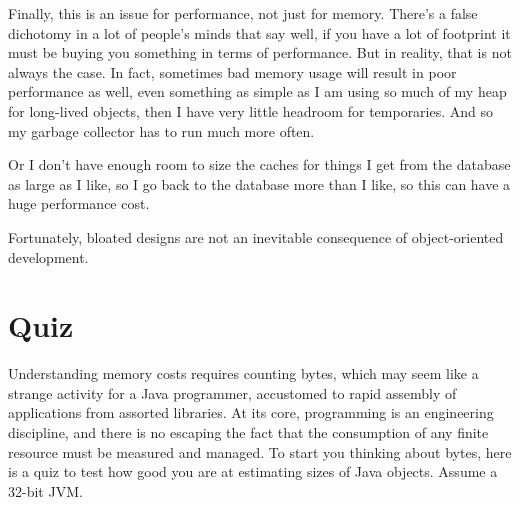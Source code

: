 Finally, this is an issue for performance, not just for memory. 
There's a false dichotomy in a lot of people's minds that say well, if you have a lot of footprint it must be buying
 you something in terms of performance. But in reality, that is not always the case. In fact, sometimes bad memory usage
  will result in poor performance as well, even something as simple as I am using so much of my heap for long-lived objects, 
  then I have very little headroom for temporaries.  And so my garbage collector has to run much more often. 

Or I don't have enough room to size the caches for things I get from the database as large as I like, 
so I go back to the database more than I like, so this can have a huge performance cost.

Fortunately, bloated designs are not an inevitable consequence of object-oriented development.

\section{Quiz}

Understanding memory costs requires counting bytes, which may seem like a strange activity for a Java programmer,
 accustomed to rapid assembly of applications from assorted libraries. At its core, programming is an engineering discipline, 
 and there is no escaping the fact that the consumption of any finite resource must be measured and managed.  
 To start you thinking about bytes, here is a quiz to test how good you are at estimating sizes of Java objects. 
 Assume a 32-bit JVM.
 
